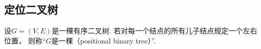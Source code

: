 \subsection{定位二叉树}
\begin{definition}
设\(G = (V,E)\)是一棵有序二叉树.
若对每一个结点的所有儿子结点规定一个左右位置，
则称“\(G\)是一棵（positional binary tree）”.
\end{definition}
